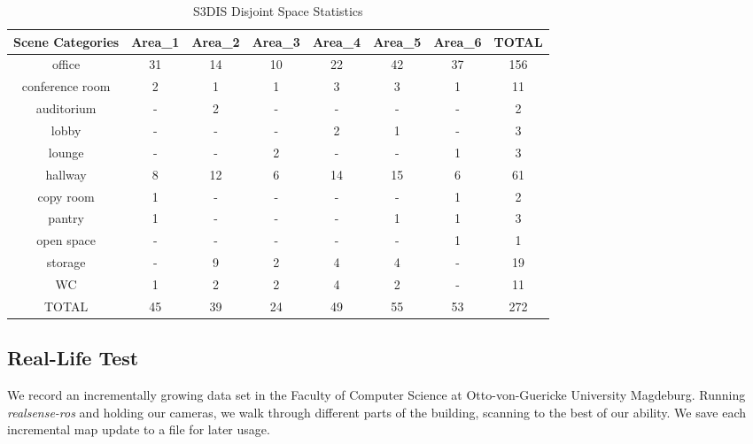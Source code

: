 \documentclass[main.tex]{subfiles}
\begin{document}
\begin{table}[!ht]
    \centering
    \begin{tabular}{c|c|c|c|c|c|c|c}
        \hline
        Scene Categories & Area\_1 & Area\_2 & Area\_3 & Area\_4 & Area\_5 & Area\_6 & TOTAL \\ \hline
        office           & 31      & 14      & 10      & 22      & 42      & 37      & 156   \\ \hline
        conference room  & 2       & 1       & 1       & 3       & 3       & 1       & 11    \\ \hline
        auditorium       & -       & 2       & -       & -       & -       & -       & 2     \\ \hline
        lobby            & -       & -       & -       & 2       & 1       & -       & 3     \\ \hline
        lounge           & -       & -       & 2       & -       & -       & 1       & 3     \\ \hline
        hallway          & 8       & 12      & 6       & 14      & 15      & 6       & 61    \\ \hline
        copy room        & 1       & -       & -       & -       & -       & 1       & 2     \\ \hline
        pantry           & 1       & -       & -       & -       & 1       & 1       & 3     \\ \hline
        open space       & -       & -       & -       & -       & -       & 1       & 1     \\ \hline
        storage          & -       & 9       & 2       & 4       & 4       & -       & 19    \\ \hline
        WC               & 1       & 2       & 2       & 4       & 2       & -       & 11    \\ \hline
        TOTAL            & 45      & 39      & 24      & 49      & 55      & 53      & 272   \\
    \end{tabular}
    \caption{S3DIS Disjoint Space Statistics}
    \label{tab:stanfordStats}
\end{table}

\subsection{Real-Life Test}
We record an incrementally growing data set in the Faculty of Computer Science at Otto-von-Guericke University Magdeburg.
Running \textit{realsense-ros} and holding our cameras, we walk through different parts of the building, scanning to the best of our ability.
We save each incremental map update to a file for later usage.
\end{document}
